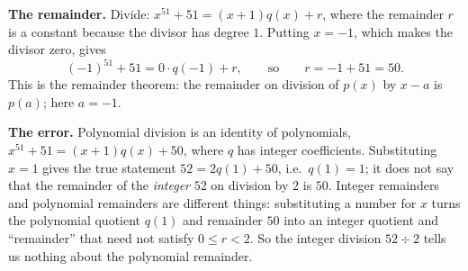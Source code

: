 \textbf{The remainder.} Divide: $x^{51}+51=(x+1)q(x)+r$, where the remainder $r$ is a constant because the divisor has degree $1$. Putting $x=-1$, which makes the divisor zero, gives
\[
(-1)^{51}+51=0\cdot q(-1)+r,\qquad\text{so}\qquad r=-1+51=\boxed{50}.
\]
This is the remainder theorem: the remainder on division of $p(x)$ by $x-a$ is $p(a)$; here $a=-1$.

\textbf{The error.} Polynomial division is an identity of polynomials, $x^{51}+51=(x+1)q(x)+50$, where $q$ has integer coefficients. Substituting $x=1$ gives the true statement $52=2q(1)+50$, i.e.\ $q(1)=1$; it does not say that the remainder of the \emph{integer} $52$ on division by $2$ is $50$. Integer remainders and polynomial remainders are different things: substituting a number for $x$ turns the polynomial quotient $q(1)$ and remainder $50$ into an integer quotient and ``remainder'' that need not satisfy $0\le r<2$. So the integer division $52\div2$ tells us nothing about the polynomial remainder.
